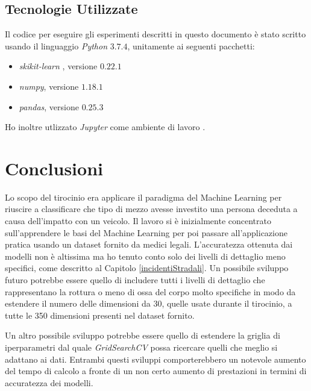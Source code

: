 \documentclass[12pt,italian]{report}
\begin{document}
\clearpage
\section{Tecnologie Utilizzate}
Il codice per eseguire gli esperimenti descritti in questo documento è stato scritto usando il linguaggio \emph{Python} $3.7.4$, unitamente ai seguenti pacchetti:
\begin{itemize}
	\item \emph{skikit-learn} \cite{scikit-learn}, versione $0.22.1$
	\item \emph{numpy}, versione $1.18.1$
	\item \emph{pandas}, versione $0.25.3$
\end{itemize} 
 Ho inoltre utlizzato \emph{Jupyter} come ambiente di lavoro \cite{jupyter}.

% 
% 
\chapter*{Conclusioni}

Lo scopo del tirocinio era applicare il paradigma del Machine Learning per riuscire a classificare che tipo di mezzo avesse investito una persona deceduta a causa dell'impatto con un veicolo. Il lavoro si è inizialmente concentrato sull'apprendere le basi del Machine Learning per poi passare all'applicazione pratica usando un dataset fornito da medici legali. L'accuratezza ottenuta dai modelli non è altissima ma ho tenuto conto solo dei livelli di dettaglio meno specifici, come descritto al Capitolo \ref{incidentiStradali}. Un possibile sviluppo futuro potrebbe essere quello di includere tutti i livelli di dettaglio che rappresentano la rottura o meno di ossa del corpo molto specifiche in modo da estendere il numero delle dimensioni da 30, quelle usate durante il tirocinio, a tutte le 350 dimensioni presenti nel dataset fornito. 

Un altro possibile sviluppo potrebbe essere quello di estendere la griglia di iperparametri dal quale \emph{GridSearchCV} possa ricercare quelli che meglio si adattano ai dati.
Entrambi questi sviluppi comporterebbero un notevole aumento del tempo di calcolo a fronte di un non certo aumento di prestazioni in termini di accuratezza dei modelli.

%
%



\end{document}
